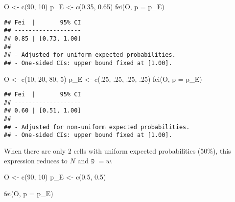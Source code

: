 \documentclass[
]{article}
\newenvironment{Shaded}{\begin{snugshade}}{\end{snugshade}}
\newcommand{\AttributeTok}[1]{\textcolor[rgb]{0.77,0.63,0.00}{#1}}
\newcommand{\DecValTok}[1]{\textcolor[rgb]{0.00,0.00,0.81}{#1}}
\newcommand{\FloatTok}[1]{\textcolor[rgb]{0.00,0.00,0.81}{#1}}
\newcommand{\FunctionTok}[1]{\textcolor[rgb]{0.00,0.00,0.00}{#1}}
\newcommand{\NormalTok}[1]{#1}
\newcommand{\OtherTok}[1]{\textcolor[rgb]{0.56,0.35,0.01}{#1}}
\begin{document}
\begin{Shaded}
\begin{Highlighting}[]
\NormalTok{O }\OtherTok{\textless{}{-}} \FunctionTok{c}\NormalTok{(}\DecValTok{90}\NormalTok{, }\DecValTok{10}\NormalTok{)}
\NormalTok{p\_E }\OtherTok{\textless{}{-}} \FunctionTok{c}\NormalTok{(}\FloatTok{0.35}\NormalTok{, }\FloatTok{0.65}\NormalTok{)}
\FunctionTok{fei}\NormalTok{(O, }\AttributeTok{p =}\NormalTok{ p\_E)}
\end{Highlighting}
\end{Shaded}

\begin{verbatim}
## Fei  |       95% CI
## -------------------
## 0.85 | [0.73, 1.00]
## 
## - Adjusted for uniform expected probabilities.
## - One-sided CIs: upper bound fixed at [1.00].
\end{verbatim}

\begin{Shaded}
\begin{Highlighting}[]
\NormalTok{O }\OtherTok{\textless{}{-}} \FunctionTok{c}\NormalTok{(}\DecValTok{10}\NormalTok{, }\DecValTok{20}\NormalTok{, }\DecValTok{80}\NormalTok{, }\DecValTok{5}\NormalTok{)}
\NormalTok{p\_E }\OtherTok{\textless{}{-}} \FunctionTok{c}\NormalTok{(.}\DecValTok{25}\NormalTok{, .}\DecValTok{25}\NormalTok{, .}\DecValTok{25}\NormalTok{, .}\DecValTok{25}\NormalTok{)}
\FunctionTok{fei}\NormalTok{(O, }\AttributeTok{p =}\NormalTok{ p\_E)}
\end{Highlighting}
\end{Shaded}

\begin{verbatim}
## Fei  |       95% CI
## -------------------
## 0.60 | [0.51, 1.00]
## 
## - Adjusted for non-uniform expected probabilities.
## - One-sided CIs: upper bound fixed at [1.00].
\end{verbatim}

When there are only 2 cells with uniform expected probabilities (50\%),
this expression reduces to \(N\) and פ \(= w\).

\begin{Shaded}
\begin{Highlighting}[]
\NormalTok{O }\OtherTok{\textless{}{-}} \FunctionTok{c}\NormalTok{(}\DecValTok{90}\NormalTok{, }\DecValTok{10}\NormalTok{)}
\NormalTok{p\_E }\OtherTok{\textless{}{-}} \FunctionTok{c}\NormalTok{(}\FloatTok{0.5}\NormalTok{, }\FloatTok{0.5}\NormalTok{)}

\FunctionTok{fei}\NormalTok{(O, }\AttributeTok{p =}\NormalTok{ p\_E)}
\end{Highlighting}
\end{Shaded}
\end{document}
